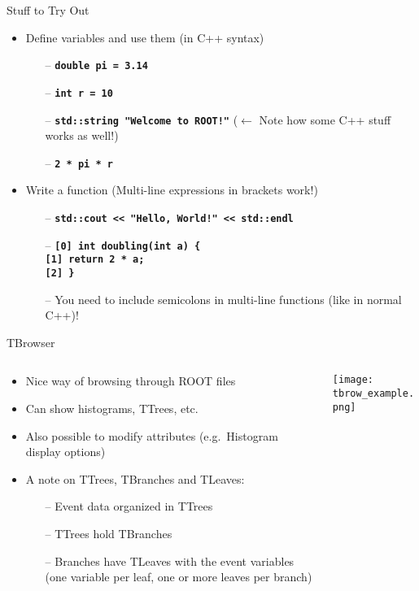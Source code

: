 \documentclass[10pt, aspectratio=169]{beamer}
\begin{document}
\begin{frame}{Stuff to Try Out}
  \begin{itemize}
    \item
      Define variables and use them (in C++ syntax)
    \begin{itemize}
      \item[--] \textbf{\texttt{double pi = 3.14}}
      \item[--] \textbf{\texttt{int r = 10}}
      \item[--] \textbf{\texttt{std::string "Welcome to ROOT!"}} ($\leftarrow$ Note how some C++ stuff works as well!)
      \item[--] \textbf{\texttt{2 * pi * r}}
    \end{itemize}
    \item
      Write a function (Multi-line expressions in brackets work!)
    \begin{itemize}
      \item[--] \textbf{\texttt{std::cout << "Hello, World!" << std::endl}}
      \item[--] \textbf{\texttt{[0] int doubling(int a) \{}} \\
                \textbf{\texttt{[1] return 2 * a;}} \\
                \textbf{\texttt{[2] \}}}
      \item[--] You need to include semicolons in multi-line functions (like in normal C++)!
    \end{itemize}
  \end{itemize}
  
\end{frame}

\begin{frame}{TBrowser}
  \begin{columns}
    \begin{column}{0.49\textwidth}
  \begin{itemize}
    \item
      Nice way of browsing through ROOT files
    \item
      Can show histograms, TTrees, etc.
    \item
      Also possible to modify attributes (e.g.~Histogram display options)
    \item
      A note on TTrees, TBranches and TLeaves:
    \begin{itemize}
      \item[--]
        Event data organized in TTrees
      \item[--]
        TTrees hold TBranches
      \item[--]
        Branches have TLeaves with the event variables (one variable per leaf, one or more leaves per branch)
    \end{itemize}
  \end{itemize}
    \end{column}
    \hfill
    \begin{column}{0.49\textwidth}
      \texttt{[image: tbrow\_example.png]}
    \end{column}
  \end{columns}
\end{frame}
\end{document}
